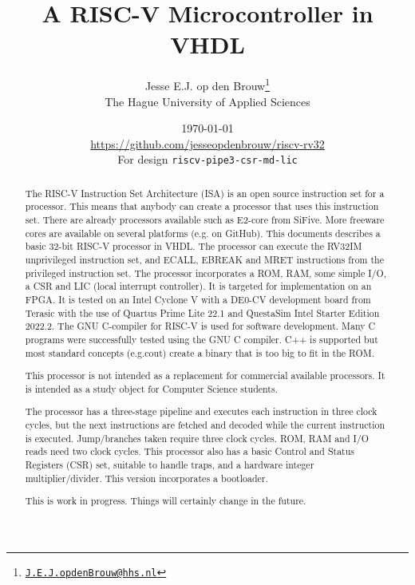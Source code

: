 \documentclass[12pt]{article}
\author{Jesse E.J. op den Brouw\thanks{\href{mailto:J.E.J.opdenBrouw@hhs.nl}{\texttt{J.E.J.opdenBrouw@hhs.nl}}}\\[2ex]The Hague University of Applied Sciences}
\title{A RISC-V Microcontroller in VHDL}
\date{\today\\[2ex]\normalsize\url{https://github.com/jesseopdenbrouw/riscv-rv32}\\[2ex]For design \texttt{riscv-pipe3-csr-md-lic}}
\begin{document}
\maketitle

\vfill
\begin{abstract}
\baselineskip
\noindent
The RISC-V Instruction Set Architecture (ISA) is an open source instruction set for a processor. This means that anybody can create a processor that uses this instruction set. There are already processors available such as E2-core from SiFive. More freeware cores are available on several platforms (e.g. on GitHub). This documents describes a basic 32-bit RISC-V processor in VHDL. The processor can execute the RV32IM unprivileged instruction set, and ECALL, EBREAK and MRET instructions from the privileged instruction set. The processor incorporates a ROM, RAM, some simple I/O, a CSR and LIC (local interrupt controller). It is targeted for implementation on an FPGA. It is tested on an Intel Cyclone V with a DE0-CV development board from Terasic with the use of Quartus Prime Lite 22.1 and QuestaSim Intel Starter Edition 2022.2. The GNU C-compiler for RISC-V is used for software development. Many C programs were successfully tested using the GNU C compiler. C++ is supported but most standard concepts (e.g.\@ cout) create a binary that is too big to fit in the ROM.

\noindent
This processor is not intended as a replacement for commercial available processors. It is intended as a study object for Computer Science students.

\noindent
The processor has a three-stage pipeline and executes each instruction in three clock cycles, but the next instructions are fetched and decoded while the current instruction is executed. Jump/branches taken require three clock cycles. ROM, RAM and I/O reads need two clock cycles. This processor also has a basic Control and Status Registers (CSR) set, suitable to handle traps, and a hardware integer multiplier/divider. This version incorporates a bootloader.

\noindent
This is work in progress. Things will certainly change in the future.
\end{abstract}
\vfill

\clearpage
\tableofcontents

\clearpage
\end{document}

